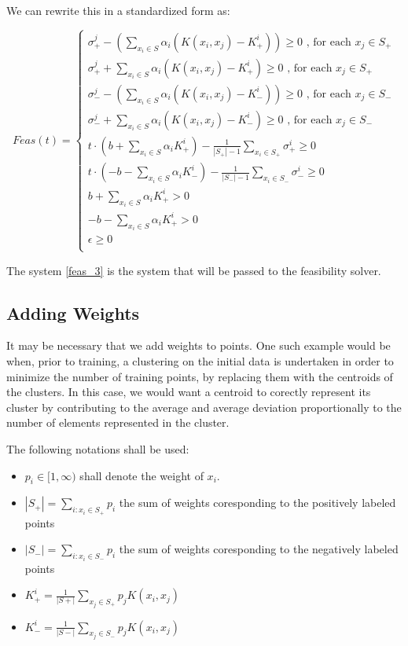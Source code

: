 \documentclass[a4paper,twoside,10pt]{report}
\begin{document}
	We can rewrite this in a standardized form as:
	
	\[
		Feas(t) = \left\{
		\begin{array}{l}			
				\sigma^j_+ - (\sum_{x_i\in S} {\alpha_i (K(x_i, x_j) - K^i_+)}) \geq 0 \mbox{ , for each } x_j \in S_+\\
				\sigma^j_+ + \sum_{x_i\in S} {\alpha_i (K(x_i, x_j) - K^i_+)} \geq 0 \mbox{ , for each } x_j \in S_+\\
				
				\sigma^j_- - (\sum_{x_i\in S} {\alpha_i (K(x_i, x_j) - K^i_-)}) \geq 0 \mbox{ , for each } x_j \in S_-\\
				\sigma^j_- + \sum_{x_i\in S} {\alpha_i (K(x_i, x_j) - K^i_-)} \geq 0 \mbox{ , for each } x_j \in S_-\\									
				
				t \cdot (b + \sum_{x_i\in S}{\alpha_i K^i_+}) - \frac{1}{|S_+| - 1} \sum_{x_i\in S_+} {\sigma_+^i} \geq 0\\
				t \cdot (- b - \sum_{x_i\in S}{\alpha_i K^i_-}) - \frac{1}{|S_-| - 1} \sum_{x_i\in S_-} {\sigma_-^i} \geq 0\\
				b + \sum_{x_i\in S}{\alpha_i K^i_+} > 0\\
				- b - \sum_{x_i\in S}{\alpha_i K^i_+} > 0\\
				\epsilon \geq 0\\
		\end{array}
		\right. \label{feas_3}
	\]		
	
	The system \ref{feas_3} is the system that will be passed to the feasibility solver.
	
\subsection{Adding Weights}	
	
	It may be necessary that we add weights to points. One such example would be when, prior to training, a clustering on the initial data 
is undertaken in order to minimize the number of training points, by replacing them with the centroids of the clusters. In this case, we would want 
a centroid to corectly represent its cluster by contributing to the average and average deviation proportionally to the number of elements represented in the cluster.

	The following notations shall be used: 
	
	\begin{itemize}
	 \item \(p_i \in [1, \infty)\) shall denote the weight of \(x_i\). 
	 \item \(|S_+| =\sum_{i : x_i\in S_+}{p_i}\) the sum of weights coresponding to the positively labeled points
	 \item \(|S_-| =\sum_{i : x_i\in S_-}{p_i}\) the sum of weights coresponding to the negatively labeled points
	 \item \(K^i_+ = \frac{1}{|S+|} \sum_{x_j\in S_+}{p_j K(x_i, x_j)}\)
	 \item \(K^i_- = \frac{1}{|S-|} \sum_{x_j\in S_-}{p_j K(x_i, x_j)}\)
	\end{itemize}
	
\end{document}
